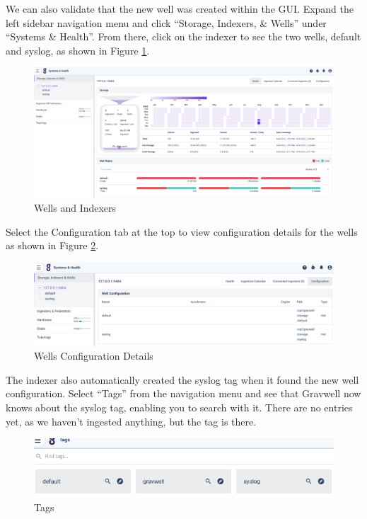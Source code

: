 {{We can also validate that the new well was created within the GUI.
Expand the left sidebar navigation menu and click ``Storage, Indexers, \& Wells'' under
``Systems \& Health''. From there, click on the indexer to see the two wells, 
default and syslog, as shown in Figure \ref{fig:wells}.

\begin{figure}
	\includegraphics{images/wells.png}
	\caption{Wells and Indexers}
	\label{fig:wells}
\end{figure}

Select the Configuration tab at the top to view configuration details for the wells
as shown in Figure \ref{fig:wells-config}.

\begin{figure}
	\includegraphics{images/wells-config.png}
	\caption{Wells Configuration Details}
	\label{fig:wells-config}
\end{figure}

The indexer also automatically created the syslog tag when it found the
new well configuration. Select ``Tags'' from the navigation menu and see that
Gravwell now knows about the syslog tag, enabling you to search with
it. There are no entries yet, as we haven't ingested anything, but the
tag is there.

\begin{figure}
	\includegraphics{images/tags.png}
	\caption{Tags}
\end{figure}

}}
